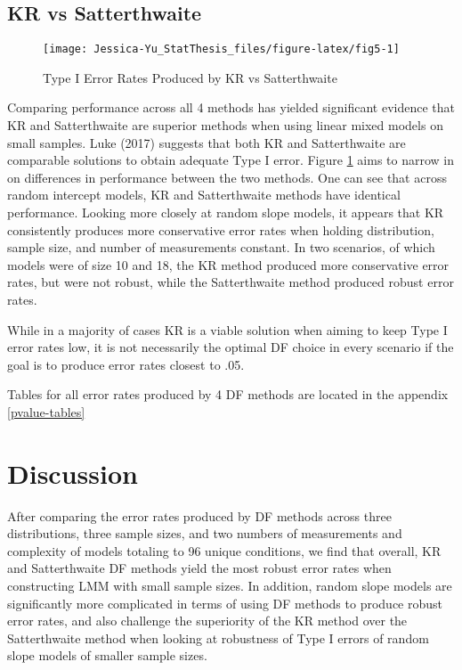 \documentclass[12pt, twoside]{amherstthesis}
\begin{document}
\hypertarget{kr-vs-satterthwaite}{%
\subsection{KR vs Satterthwaite}\label{kr-vs-satterthwaite}}
\begin{figure}

{\centering \texttt{[image: Jessica-Yu\_StatThesis\_files/figure-latex/fig5-1]} 

}

\caption{Type I Error Rates Produced by KR vs Satterthwaite}\label{fig:fig5}
\end{figure}
Comparing performance across all 4 methods has yielded significant evidence that KR and Satterthwaite are superior methods when using linear mixed models on small samples. Luke (2017) suggests that both KR and Satterthwaite are comparable solutions to obtain adequate Type I error. Figure \ref{fig:fig5} aims to narrow in on differences in performance between the two methods. One can see that across random intercept models, KR and Satterthwaite methods have identical performance. Looking more closely at random slope models, it appears that KR consistently produces more conservative error rates when holding distribution, sample size, and number of measurements constant. In two scenarios, of which models were of size 10 and 18, the KR method produced more conservative error rates, but were not robust, while the Satterthwaite method produced robust error rates.

While in a majority of cases KR is a viable solution when aiming to keep Type I error rates low, it is not necessarily the optimal DF choice in every scenario if the goal is to produce error rates closest to .05.

Tables for all error rates produced by 4 DF methods are located in the appendix \ref{pvalue-tables}

\hypertarget{discussion}{%
\section{Discussion}\label{discussion}}

After comparing the error rates produced by DF methods across three distributions, three sample sizes, and two numbers of measurements and complexity of models totaling to 96 unique conditions, we find that overall, KR and Satterthwaite DF methods yield the most robust error rates when constructing LMM with small sample sizes. In addition, random slope models are significantly more complicated in terms of using DF methods to produce robust error rates, and also challenge the superiority of the KR method over the Satterthwaite method when looking at robustness of Type I errors of random slope models of smaller sample sizes.
\end{document}
